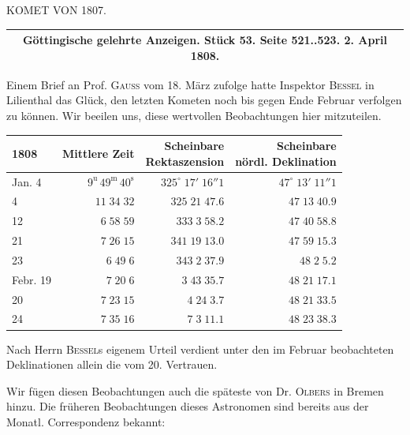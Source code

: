 \begin{center}
KOMET VON 1807.
\end{center}

\begin{center}
\fontsize{10}{12}\selectfont\begin{tabular}{c}
\hline
Göttingische gelehrte Anzeigen. Stück 53. Seite 521..523. 2. April 1808. \\
\hline
\end{tabular}
\end{center}

Einem Brief an Prof. \textsc{Gauss} vom 18. März zufolge hatte Inspektor \textsc{Bessel} in Lilienthal das Glück, den letzten Kometen noch bis gegen Ende Februar verfolgen zu können. Wir beeilen uns, diese wertvollen Beobachtungen hier mitzuteilen.


\begin{center}\fontsize{10}{12}\selectfont\setlength{\tabcolsep}{3pt}\renewcommand{\arraystretch}{1.15}\begin{tabular}{lrrr}
1808 & Mittlere Zeit & \shortstack{Scheinbare\\Rektaszension} & \shortstack{Scheinbare\\nördl. Deklination}\\\hline
Jan. 4 & $9^{\text{u}}\,49^{\text{m}}\,40^{\text{s}}$ & $325^\circ\;17'\;16''1$ & $47^\circ\;13'\;11''1$\\
4 & $11\;34\;32$ & $325\;21\;47.6$ & $47\;13\;40.9$\\
12 & $6\;58\;59$ & $333\;3\;58.2$ & $47\;40\;58.8$\\
21 & $7\;26\;15$ & $341\;19\;13.0$ & $47\;59\;15.3$\\
23 & $6\;49\;6$ & $343\;2\;37.9$ & $48\;2\;5.2$\\
Febr. 19 & $7\;20\;6$ & $3\;43\;35.7$ & $48\;21\;17.1$\\
20 & $7\;23\;15$ & $4\;24\;3.7$ & $48\;21\;33.5$\\
24 & $7\;35\;16$ & $7\;3\;11.1$ & $48\;23\;38.3$\\
\end{tabular}\end{center}

\par\indent Nach Herrn \textsc{Bessel}s eigenem Urteil verdient unter den im Februar beobachteten Deklinationen allein die vom 20. Vertrauen.

Wir fügen diesen Beobachtungen auch die späteste von Dr. \textsc{Olbers} in Bremen hinzu. Die früheren Beobachtungen dieses Astronomen sind bereits aus der Monatl. Correspondenz bekannt:

